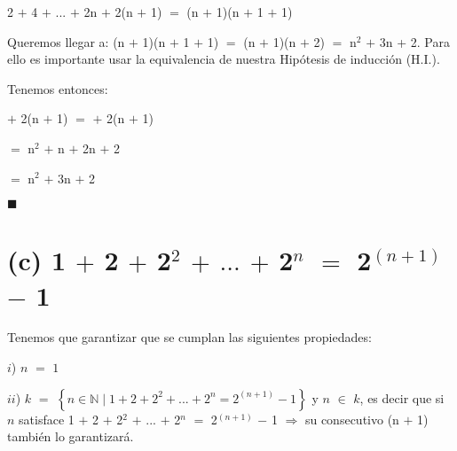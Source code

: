 \documentclass[12pt]{article}
\renewcommand{\qedsymbol}{$\blacksquare$}
\newenvironment{MyColorPar}[1]{%
    \leavevmode\color{#1}\ignorespaces%
}{%
}%
\begin{document}
\hspace{2cm} 2 $+$ 4 $+$ $...$ $+$ 2n $+$ 2(n $+$ 1) $=$ (n $+$ 1)(n $+$ 1 $+$ 1) \vspace{0.2cm} 

Queremos llegar a: (n $+$ 1)(n $+$ 1 $+$ 1) $=$ (n $+$ 1)(n $+$ 2) $=$ n$^{2}$ $+$ 3n + 2. Para ello es importante usar la equivalencia de nuestra  {\textcolor{verde_manzana}{Hipótesis de inducción (H.I.). }}  \vspace{0.2cm}

Tenemos entonces: \vspace{0.5cm}

\hspace{1cm} {\textcolor{verde_manzana}{}} $+$ 2(n $+$ 1) $=$ {\textcolor{verde_manzana}{}} $+$ 2(n $+$ 1) \vspace{0.2cm}

\hspace{7.7cm} $=$ n$^{2}$ $+$ n $+$ 2n $+$ 2 \vspace{0.2cm}

\hspace{7.7cm} $=$ n$^{2}$ $+$ 3n $+$ 2 \vspace{0.2cm}
 
\hspace{8cm} \qedsymbol \vspace{0.5cm}

\newpage


\section*{(c) 1 $+$ 2 $+$ 2$^{2}$ $+$ $...$ $+$ 2$^{n}$ $=$ 2$^{(n+1)}$ $-$ 1} 

 \begin{MyColorPar}{Boston Blue}
 
 Tenemos que garantizar que se cumplan las siguientes propiedades: 
 
\end{MyColorPar} \vspace{0.2cm}

 \begin{MyColorPar}{verde_manzana}
 $i$) $n$ $=$ $1$
 
 $ii$) $k$ $=$ $\left\{n \in \mathbb{N} \mid 1 + 2 + 2^{2} + ... + 2^{n} = 2^{(n+1)} - 1 \right\}$ y $n$ $\in$ $k$, es decir que si $n$ satisface 1 $+$ 2 $+$ 2$^{2}$ $+$ $...$ $+$ 2$^{n}$ $=$ 2$^{(n+1)}$ $-$ 1 \hspace{0.2cm} $\Longrightarrow$ \hspace{0.2cm} su consecutivo (n $+$ 1) también lo garantizará.
 \end{MyColorPar} \vspace{0.2cm}
\end{document}

